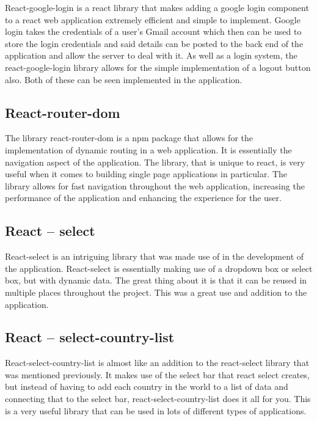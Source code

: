 React-google-login is a react library that makes adding a google login component to a react web application extremely efficient and simple to implement. Google login takes the credentials of a user’s Gmail account which then can be used to store the login credentials and said details can be posted to the back end of the application and allow the server to deal with it. As well as a login system, the react-google-login library allows for the simple implementation of a logout button also. Both of these can be seen implemented in the application.\cite{react-google-login} \\

\subsection{React-router-dom}

The library react-router-dom is a npm package that allows for the implementation of dynamic routing in a web application. It is essentially the navigation aspect of the application. The library, that is unique to react, is very useful when it comes to building single page applications in particular. The library allows for fast navigation throughout the web application, increasing the performance of the application and enhancing the experience for the user.\cite{Router-dom}\\

\subsection{React – select}

React-select is an intriguing library that was made use of in the development of the application. React-select is essentially making use of a dropdown box or select box, but with dynamic data. The great thing about it is that it can be reused in multiple places throughout the project. This was a great use and addition to the application.\cite{Select} \\

\subsection{React – select-country-list}

React-select-country-list is almost like an addition to the react-select library that was mentioned previously. It makes use of the select bar that react select creates, but instead of having to add each country in the world to a list of data and connecting that to the select bar, react-select-country-list does it all for you. This is a very useful library that can be used in lots of different types of applications.\cite{select-country}\\

